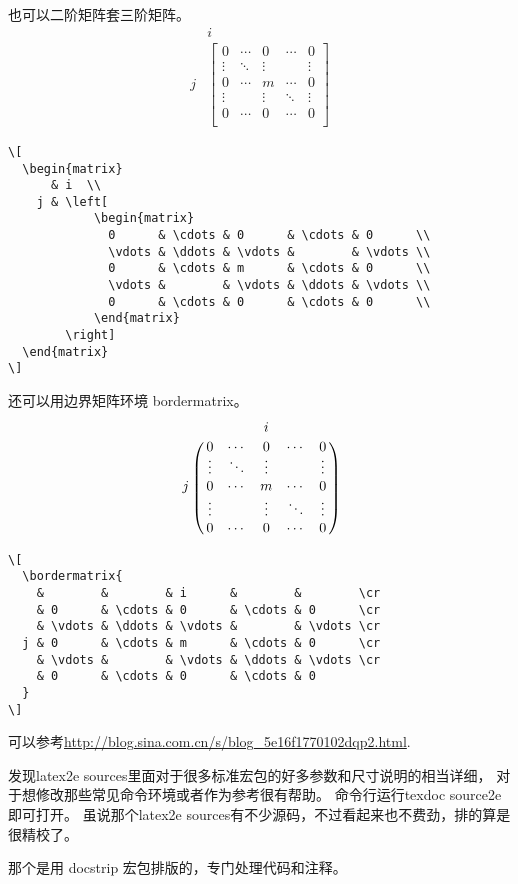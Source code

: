 \documentclass[QAofGroup.tex]{subfiles}
\begin{document}
也可以二阶矩阵套三阶矩阵。
\[
\begin{matrix}
&i\\
j&\left[ \begin{matrix}
0&\cdots&0&\cdots&0\\
\vdots&\ddots&\vdots&&\vdots\\
0&\cdots&m&\cdots&0\\
\vdots&&\vdots&\ddots&\vdots\\
0&\cdots&0&\cdots&0\\
\end{matrix} \right]
\end{matrix}
\]
\begin{verbatim}
\[
  \begin{matrix}
      & i  \\
    j & \left[
            \begin{matrix}
              0      & \cdots & 0      & \cdots & 0      \\
              \vdots & \ddots & \vdots &        & \vdots \\
              0      & \cdots & m      & \cdots & 0      \\
              \vdots &        & \vdots & \ddots & \vdots \\
              0      & \cdots & 0      & \cdots & 0      \\
            \end{matrix} 
        \right]
  \end{matrix}
\]
\end{verbatim}

还可以用边界矩阵环境 bordermatrix。
\[
\bordermatrix{
	&	     &        & i      &		&        \cr
	& 0      & \cdots & 0      & \cdots & 0      \cr
	& \vdots & \ddots & \vdots &		& \vdots \cr
  j & 0      & \cdots & m      & \cdots & 0      \cr
	& \vdots &		  & \vdots & \ddots & \vdots \cr
	& 0      & \cdots & 0      & \cdots & 0
}
\]
\begin{verbatim}
\[
  \bordermatrix{
    &        &        & i      &        &        \cr
    & 0      & \cdots & 0      & \cdots & 0      \cr
    & \vdots & \ddots & \vdots &        & \vdots \cr
  j & 0      & \cdots & m      & \cdots & 0      \cr
    & \vdots &        & \vdots & \ddots & \vdots \cr
    & 0      & \cdots & 0      & \cdots & 0
  }
\]
\end{verbatim}

可以参考\url{http://blog.sina.com.cn/s/blog_5e16f1770102dqp2.html}.

\begin{qst}\label{Q2017110203}
发现latex2e sources里面对于很多标准宏包的好多参数和尺寸说明的相当详细，
 对于想修改那些常见命令环境或者作为参考很有帮助。
命令行运行texdoc source2e即可打开。
虽说那个latex2e sources有不少源码，不过看起来也不费劲，排的算是很精校了。

\end{qst}
\ans 那个是用 docstrip 宏包排版的，专门处理代码和注释。
\end{document}
